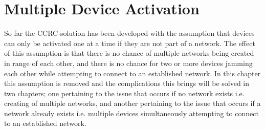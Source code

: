\chapter{Multiple Device Activation}\label{chap:MDA-CCRC}
So far the CCRC-solution has been developed with the assumption that devices can only be activated one at a time if they are not part of a network.
The effect of this assumption is that there is no chance of multiple networks being created in range of each other, and there is no chance for two or more devices jamming each other while attempting to connect to an established network.
In this chapter this assumption is removed and the complications this brings will be solved in two chapters; one pertaining to the issue that occurs if no network exists i.e. creating of multiple networks, and another pertaining to the issue that occurs if a network already exists i.e. multiple devices simultaneously attempting to connect to an established network.

